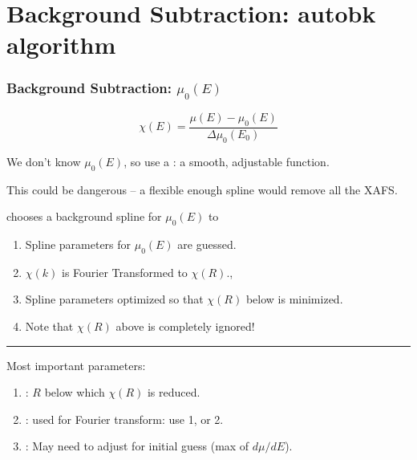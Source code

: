\section{Background Subtraction: autobk algorithm}


\begin{frame} \frametitle{Background Subtraction: $\mu_0(E)$}

\begin{cenpage}{130mm}

  \[ \chi(E) = \frac{\mu(E) - \mu_0(E)}{\Delta \mu_0(E_0)} \]

\vmm
We don't know ${\mu_0(E)}$, so use a {}: a smooth, adjustable function.

\vmm

This could be dangerous -- a flexible enough spline would remove all the XAFS.

\vmm
\pause

{\athena} chooses a background spline for $\mu_0(E)$ to

\begin{center}
  \begin{postitbox}{55mm}
    {}
  \end{postitbox}
\end{center}

\begin{enumerate}
  \item Spline parameters for $\mu_0(E)$ are guessed.
  \item $\chi(k)$ is Fourier Transformed to $\chi(R)$.,
  \item Spline parameters optimized so that $\chi(R)$ below  is minimized.
  \item Note that $\chi(R)$ above  is completely ignored!
\end{enumerate}


\vmm  \hrule \vmm

Most important parameters:

\begin{enumerate}
\item {}: $R$ below which $\chi(R)$ is reduced.
\item {}:  used for Fourier transform:   use 1, or 2.
\item {}:         May need to adjust for initial guess (max of $d\mu/dE$).
\end{enumerate}

\end{cenpage}
\end{frame}


